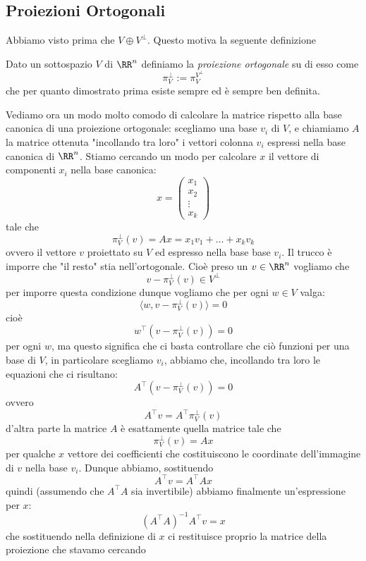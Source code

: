 \documentclass[11pt]{scrartcl}
\begin{document}
   	 \subsection{Proiezioni Ortogonali}
   	 
   	 Abbiamo visto prima che $V\oplus V^\perp$. Questo motiva la seguente definizione
   	 \begin{definition}
   	 	Dato un sottospazio $V$  di $\RR^n$ definiamo la \textit{proiezione ortogonale} su di esso come
   	 	$$\pi_V^\perp:=\pi_{V}^{V^\perp}$$
   	 	che per quanto dimostrato prima esiste sempre ed è sempre ben definita.
   	 \end{definition}
   	 Vediamo ora un modo molto comodo di calcolare la matrice rispetto alla base canonica di una proiezione ortogonale: scegliamo una base $v_i$ di $V$, e chiamiamo $A$ la matrice ottenuta "incollando tra loro" i vettori colonna $v_i$ espressi nella base canonica di $\RR^n$. Stiamo cercando un modo per calcolare $x$ il vettore di componenti $x_i$ nella base canonica:
   	 $$x=\begin{pmatrix}
   	 	x_1 \\
   	 	x_2 \\
   	 	\vdots \\
   	 	x_k
   	 \end{pmatrix}$$
   	 tale che
   	 $$\pi_{V}^\perp(v)=Ax=x_1v_1+\dots+x_kv_k$$
   	 ovvero il vettore $v$ proiettato su $V$ ed espresso nella base base $v_i$.
   	 Il trucco è imporre che "il resto" stia nell'ortogonale. Cioè preso un $v\in \RR^n$  vogliamo che 
   	 $$v-\pi_V^\perp\left(v\right)\in V^\perp$$
   	 per imporre questa condizione dunque vogliamo che per ogni $w\in V$ valga:
   	 $$\langle w,v-\pi_V^\perp(v) \rangle=0$$
   	 cioè
   	 $$w^\intercal (v-\pi_V^\perp(v))=0$$
   	 per ogni $w$, ma questo significa che ci basta controllare che ciò funzioni per una base di $V$, in particolare scegliamo $v_i$, abbiamo che, incollando tra loro le equazioni che ci risultano:
   	 $$A^\intercal (v-\pi_V^\perp(v))=0$$
   	 ovvero
   	 $$A^\intercal v=A^\intercal \pi_V^\perp(v)$$
   	 d'altra parte la matrice $A$ è esattamente quella matrice tale che
   	 $$\pi_V^\perp(v)=Ax$$
   	 per qualche $x$ vettore dei coefficienti che costituiscono le coordinate dell'immagine di $v$ nella base $v_i$. Dunque abbiamo, sostituendo
   	 $$A^\intercal v = A^\intercal A x$$
   	 quindi (assumendo che $A^\intercal A$ sia invertibile) abbiamo finalmente un'espressione per $x$: 
   	 $$\left(A^\intercal A\right)^{-1}A^\intercal v = x$$
   	 che sostituendo nella definizione di $x$ ci restituisce proprio la matrice della proiezione che stavamo cercando
\end{document}
